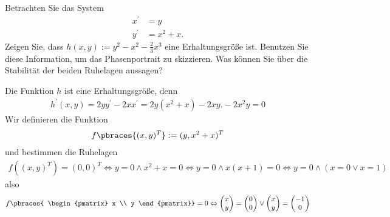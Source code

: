 \begin{exercise}
Betrachten Sie das System
\begin{align*}
  x^{\prime} &= y \\
  y^{\prime} &= x^2 + x.
\end{align*}
Zeigen Sie, dass $h(x,y) := y^2 - x^2 -\frac{2}{3}x^3$ eine Erhaltungsgröße ist.
Benutzen Sie diese Information, um das Phasenportrait zu skizzieren.
Was können Sie über die Stabilität der beiden Ruhelagen aussagen?
\end{exercise}
\begin{solution}
  Die Funktion $h$ ist eine Erhaltungsgröße, denn
  \begin{align*}
      h^\prime(x, y) = 2yy^\prime - 2xx^\prime = 2y(x^2 + x) - 2xy. -2x^2y = 0
  \end{align*}
  Wir definieren die Funktion
  \begin{align*}
    f\pbraces{(x, y)^T} := (y, x^2 + x)^T  
  \end{align*}
  und bestimmen die Ruhelagen 
  \begin{align*}
    f((x,y)^T) = (0, 0)^T \Leftrightarrow y = 0 \land x^2 + x = 0 \Leftrightarrow y = 0 \land x(x + 1) = 0 \Leftrightarrow y = 0 \land (x = 0 \lor x = 1)
  \end{align*}
  also 
  \begin{align*}
    f \pbraces{
    \begin{pmatrix}
      x \\ y
    \end{pmatrix}}
    = 0 \Leftrightarrow
    \begin{pmatrix}
      x \\ y
    \end{pmatrix}
    = 
    \begin{pmatrix}
      0 \\ 0
    \end{pmatrix} 
    \lor
    \begin{pmatrix}
      x \\ y
    \end{pmatrix}
    = 
    \begin{pmatrix}
      -1 \\ 0
    \end{pmatrix}
  \end{align*}
\end{solution}
